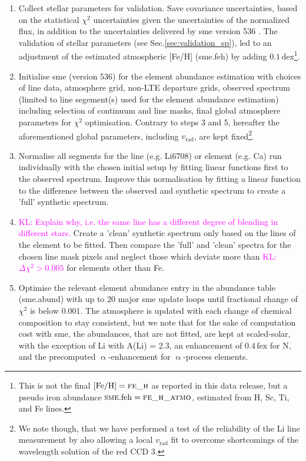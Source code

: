 \documentclass[fleqn,usenatbib,useAMS]{mnras}
\newcommand{\vrad}{$v_\mathrm{rad}$\xspace}
\newcommand\KL[1]{\textcolor{magenta}{KL: #1}}
\begin{document}
\begin{enumerate}
\item Collect stellar parameters for validation. Save covariance uncertainties, based on the statistical $\chi^2$ uncertainties given the uncertainties of the normalized flux, in addition to the uncertainties delivered by {\sc sme} version 536 \citep[see][for more details]{Piskunov2017}. The validation of stellar parameters (see Sec.\ref{sec:validation_sp}), led to an adjustment of the estimated atmospheric [Fe/H] ({\sc sme}.feh) by adding $0.1\,\mathrm{dex}$\footnote{This is not the final $\mathrm{[Fe/H]} = \textsc{fe\_h}$ as reported in this data release, but a pseudo iron abundance $\textsc{sme}.\mathrm{feh} = \textsc{fe\_h\_atmo}$, estimated from H, Sc, Ti, and Fe lines.}.
\item Initialise {\sc sme} (version 536) for the element abundance estimation with choices of line data, atmosphere grid, non-LTE departure grids, observed spectrum (limited to line segement(s) used for the element abundance estimation) including selection of continuum and line masks, final global atmosphere parameters for $\chi^2$ optimisation. Contrary to steps 3 and 5, hereafter the aforementioned global parameters, including \vrad, are kept fixed\footnote{We note though, that we have performed a test of the reliability of the Li line measurement by also allowing a local \vrad fit to overcome shortcomings of the wavelength solution of the red CCD 3.}.
\item Normalise all segments for the line (e.g. Li6708) or element (e.g. Ca) run individually with the chosen initial setup by fitting linear functions first to the observed spectrum. Improve this normalisation by fitting a linear function to the difference between the observed and synthetic spectrum to create a 'full' synthetic spectrum.
\item \KL{Explain why, i.e. the same line has a different degree of blending in different stars.} Create a 'clean' synthetic spectrum only based on the lines of the element to be fitted. Then compare the 'full' and 'clean' spectra for the chosen line mask pixels and neglect those which deviate more than \KL{$\Delta\chi^2>0.005$} for elements other than Fe.
\item Optimise the relevant element abundance entry in the abundance table ({\sc sme}.abund) with up to 20 major {\sc sme} update loops until fractional change of $\chi^2$ is below 0.001. The atmosphere is updated with each change of chemical composition to stay consistent, but we note that for the sake of computation cost with {\sc sme}, the abundances, that are not fitted, are kept at scaled-solar, with the exception of Li with A(Li) = 2.3, an enhancement of $0.4\,\mathrm{fex}$ for N, and the precomputed $\upalpha$-enhancement for $\upalpha$-process elements.

\end{enumerate}
\end{document}
